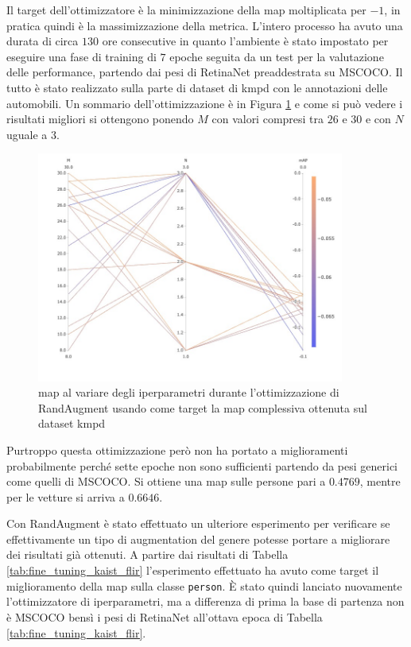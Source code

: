 Il target dell'ottimizzatore è la minimizzazione della \ac{map} moltiplicata per $-1$, in pratica quindi è la massimizzazione della metrica. L'intero processo ha avuto una durata di circa $130$ ore consecutive in quanto l'ambiente è stato impostato per eseguire una fase di training di $7$ epoche seguita da un test per la valutazione delle performance, partendo dai pesi di RetinaNet preaddestrata su \ac{MSCOCO}. Il tutto è stato realizzato sulla parte di dataset di \ac{kmpd} con le annotazioni delle automobili. Un sommario dell'ottimizzazione è in Figura \ref{fig:map_comet_ml} e come si può vedere i risultati migliori si ottengono ponendo $M$ con valori compresi tra $26$ e $30$ e con $N$ uguale a $3$.
\begin{figure}[]
    \centering
    \includegraphics[width=0.9\textwidth]{images/graphic/mAP_comet.jpeg}
    \caption{\ac{map} al variare degli iperparametri durante l'ottimizzazione di RandAugment usando come target la \ac{map} complessiva ottenuta sul dataset \ac{kmpd}}
    \label{fig:map_comet_ml}
\end{figure}

Purtroppo questa ottimizzazione però non ha portato a miglioramenti probabilmente perché sette epoche non sono sufficienti partendo da pesi generici come quelli di \ac{MSCOCO}. Si ottiene una \ac{map} sulle persone pari a $0.4769$, mentre per le vetture si arriva a $0.6646$. 

Con RandAugment è stato effettuato un ulteriore esperimento per verificare se effettivamente un tipo di augmentation del genere potesse portare a migliorare dei risultati già ottenuti. A partire dai risultati di Tabella \ref{tab:fine_tuning_kaist_flir} l'esperimento effettuato ha avuto come target il miglioramento della \ac{map} sulla classe \texttt{person}. 
È stato quindi lanciato nuovamente l'ottimizzatore di iperparametri, ma a differenza di prima la base di partenza non è \ac{MSCOCO} bensì i pesi di RetinaNet all'ottava epoca di Tabella \ref{tab:fine_tuning_kaist_flir}. 

